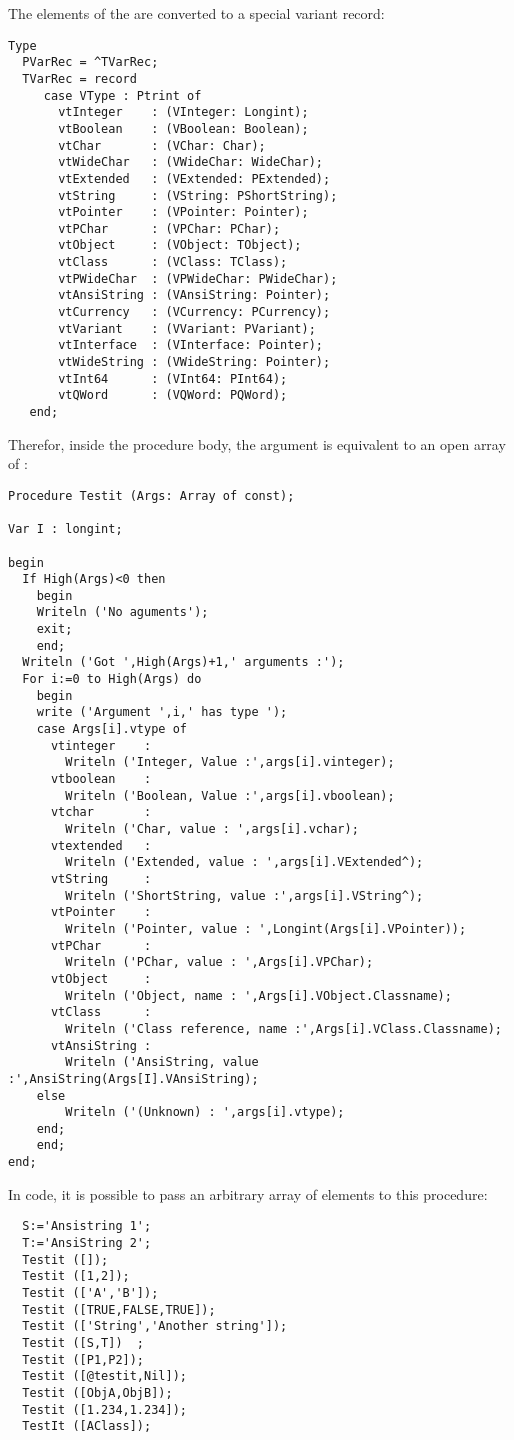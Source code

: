 The elements of the  are converted to a special variant record:
\begin{verbatim}
Type
  PVarRec = ^TVarRec;
  TVarRec = record
     case VType : Ptrint of
       vtInteger    : (VInteger: Longint);
       vtBoolean    : (VBoolean: Boolean);
       vtChar       : (VChar: Char);
       vtWideChar   : (VWideChar: WideChar);
       vtExtended   : (VExtended: PExtended);
       vtString     : (VString: PShortString);
       vtPointer    : (VPointer: Pointer);
       vtPChar      : (VPChar: PChar);
       vtObject     : (VObject: TObject);
       vtClass      : (VClass: TClass);
       vtPWideChar  : (VPWideChar: PWideChar);
       vtAnsiString : (VAnsiString: Pointer);
       vtCurrency   : (VCurrency: PCurrency);
       vtVariant    : (VVariant: PVariant);
       vtInterface  : (VInterface: Pointer);
       vtWideString : (VWideString: Pointer);
       vtInt64      : (VInt64: PInt64);
       vtQWord      : (VQWord: PQWord);
   end;
\end{verbatim}
Therefor, inside the procedure body, the  argument is equivalent to
an open array of :
\begin{verbatim}
Procedure Testit (Args: Array of const);

Var I : longint;

begin
  If High(Args)<0 then
    begin
    Writeln ('No aguments');
    exit;
    end;
  Writeln ('Got ',High(Args)+1,' arguments :');
  For i:=0 to High(Args) do
    begin
    write ('Argument ',i,' has type ');
    case Args[i].vtype of
      vtinteger    :
        Writeln ('Integer, Value :',args[i].vinteger);
      vtboolean    :
        Writeln ('Boolean, Value :',args[i].vboolean);
      vtchar       :
        Writeln ('Char, value : ',args[i].vchar);
      vtextended   :
        Writeln ('Extended, value : ',args[i].VExtended^);
      vtString     :
        Writeln ('ShortString, value :',args[i].VString^);
      vtPointer    :
        Writeln ('Pointer, value : ',Longint(Args[i].VPointer));
      vtPChar      :
        Writeln ('PChar, value : ',Args[i].VPChar);
      vtObject     :
        Writeln ('Object, name : ',Args[i].VObject.Classname);
      vtClass      :
        Writeln ('Class reference, name :',Args[i].VClass.Classname);
      vtAnsiString :
        Writeln ('AnsiString, value :',AnsiString(Args[I].VAnsiString);
    else
        Writeln ('(Unknown) : ',args[i].vtype);
    end;
    end;
end;
\end{verbatim}
In code, it is possible to pass an arbitrary array of elements
to this procedure:
\begin{verbatim}
  S:='Ansistring 1';
  T:='AnsiString 2';
  Testit ([]);
  Testit ([1,2]);
  Testit (['A','B']);
  Testit ([TRUE,FALSE,TRUE]);
  Testit (['String','Another string']);
  Testit ([S,T])  ;
  Testit ([P1,P2]);
  Testit ([@testit,Nil]);
  Testit ([ObjA,ObjB]);
  Testit ([1.234,1.234]);
  TestIt ([AClass]);
\end{verbatim}

